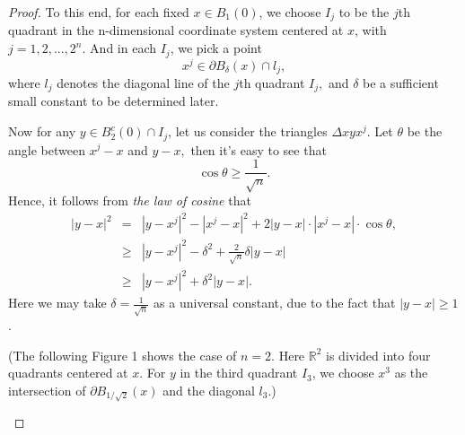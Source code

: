 \documentclass[12pt]{article}
\theoremstyle{remark}
\numberwithin{equation}{section}
\newcommand{\R}{\mathbb{R}}
\begin{document}
\begin{proof}
To this end,
for each fixed  $x\in B_1(0)$, we choose   $I_j $   to be the $j$th quadrant  in the n-dimensional coordinate system centered at $x$, with $ j=1,2,...,2^n.$ And in each $I_j$, we pick a point $$x^j\in \partial B_{\delta}(x)\cap l_j,$$ where $l_j$ denotes the diagonal line of the $j$th quadrant $I_j,$ and $\delta$ be a sufficient small constant to be determined later.

Now for any $y\in B^c_2(0)\cap I_j$,  let us consider the  triangles $\Delta xyx^j$. Let $\theta$ be the angle between $x^j-x$ and $y-x,$ then  it's easy to see  that$$ \cos\theta \geq  \frac{1}{\sqrt{n}}.$$ Hence, it follows from {\em  the law of cosine } that
\begin{eqnarray} \nonumber|y-x|^2&=& |y-x^j|^2-|x^j-x|^2+2|y-x|\cdot|x^j-x|\cdot\cos \theta, \\ \nonumber
&\geq &|y-x^j|^2-\delta^2+\frac{2}{\sqrt{n}}\delta|y-x|\\
&\geq&|y-x^j|^2+\delta^2|y-x|.
\end{eqnarray}
Here we may take $\delta =\frac{1}{\sqrt{n}}$  as  a universal constant,  due to the  fact that $|y-x|\geq1$.

(The following Figure 1 shows the case of $n=2$. Here $\R^2$ is divided into four quadrants centered at $x$.  For $y$ in the third quadrant $I_3$, we choose $x^3$ as the intersection of $\partial B_{1/\sqrt{2}}(x)$ and the diagonal $l_3$.)
\begin{center}
\end{center}
\end{proof}
\end{document}
